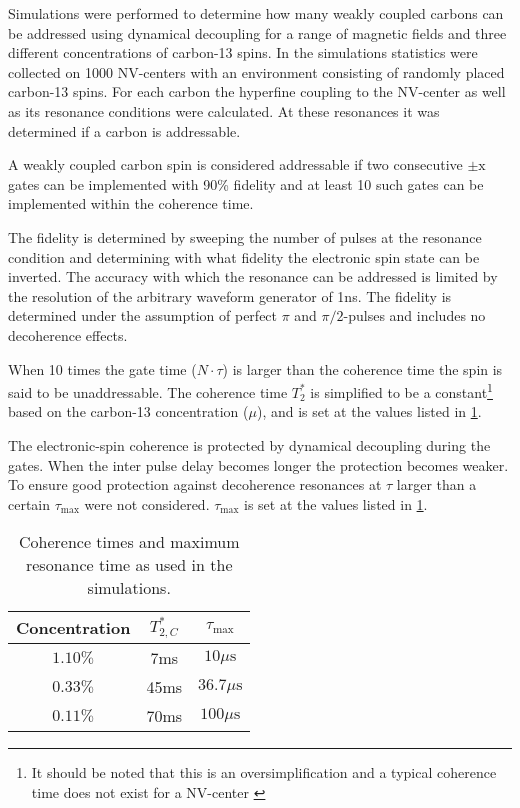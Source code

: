 Simulations were performed to determine how many weakly coupled carbons can be addressed using dynamical decoupling for a range of magnetic fields and three different concentrations of carbon-13 spins.
In the simulations statistics were collected on 1000 NV-centers with an environment consisting of randomly placed carbon-13 spins.
For each carbon the hyperfine coupling to the NV-center as well as its resonance conditions were calculated.
At these resonances it was determined if a carbon is addressable.

A weakly coupled carbon spin is considered addressable if two consecutive $\pm \mathrm{x}$ gates can be implemented with 90\% fidelity and at least 10 such gates can be implemented within the coherence time.

The fidelity is determined by sweeping the number of pulses at the resonance condition and determining with what fidelity the electronic spin state can be inverted.
The accuracy with which the resonance can be addressed is limited by the resolution of the arbitrary waveform generator of 1ns.
The fidelity is determined under the assumption of perfect $\pi$ and $\pi/2$-pulses and includes no decoherence effects.

When 10 times the gate time ($N\cdot\tau$) is larger than the coherence time the spin is said to be unaddressable.
The coherence time $T_2^* $ is simplified to be a constant\footnote{It should be noted that this is an oversimplification and a typical coherence time does not exist for a NV-center \citep{Dobrovitski2008Decoherence}} based on the carbon-13 concentration ($\mu$), and is set at the values listed in \cref{tbl:concentration_Tmaxes}.

The electronic-spin coherence is protected by dynamical decoupling during the gates.
When the inter pulse delay becomes longer the protection becomes weaker.
To ensure good protection against decoherence resonances at $\tau$ larger than a certain $\tau_\mathrm{max}$ were not considered.
$\tau_{\mathrm{max}}$ is set at the values listed in \cref{tbl:concentration_Tmaxes}.


\begin{table}[htbp]
    \centering
    \caption{Coherence times and maximum resonance time as used in the simulations.}
    \begin{tabular}{ccc}
    Concentration &  $  T_{2,C}^* $ & $  \tau_{\mathrm{max} }$ \\ \hline
    $1.10\% $&  7ms & $10\mu\mathrm{s}$\\
    $0.33\% $&  45ms & $36.7\mu\mathrm{s}$\\
    $0.11\% $&  70ms & $100\mu\mathrm{s}$\\
    \end{tabular}
    \label{tbl:concentration_Tmaxes}
\end{table}


